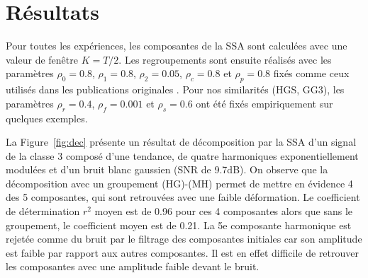 \documentclass{gretsi}
\newcommand{\set}[1]{\left \{ 1, \dots, #1 \right \}}
\begin{document}


    
       
\vspace{-.4cm}
\section{Résultats}
\label{sec:res}
\vspace{-.2cm}


Pour toutes les expériences, les composantes de la SSA sont calculées avec une valeur de fenêtre $K=T/2$.
Les regroupements sont ensuite réalisés avec les paramètres $\rho_0=0.8$, $\rho_1=0.8$, $\rho_2=0.05$, $\rho_c=0.8$ et $\rho_p=0.8$ fixés comme ceux utilisés dans les publications originales \cite{abalov_14_auto, alvarez_13_auto}. 
Pour nos similarités (HGS, GG3), les paramètres $\rho_r=0.4$, $\rho_f=0.001$ et $\rho_s=0.6$ ont été fixés empiriquement sur quelques exemples.


La Figure~\ref{fig:dec} présente un résultat de décomposition par la SSA d'un signal de la classe 3 composé d'une tendance, de quatre harmoniques exponentiellement modulées et d'un bruit blanc gaussien (SNR de 9.7dB).
On observe que la décomposition  avec un groupement (HG)-(MH) permet de mettre en évidence 4 des 5 composantes, qui sont retrouvées avec une faible déformation. 
Le coefficient de détermination $r^2$ moyen est de 0.96 pour ces 4 composantes alors que sans le groupement, le coefficient moyen est de 0.21.
La 5e composante harmonique est rejetée comme du bruit par le filtrage des composantes initiales car son amplitude est faible par rapport aux autres composantes.
Il est en effet difficile de retrouver les composantes avec une amplitude faible devant le bruit.
\end{document}
